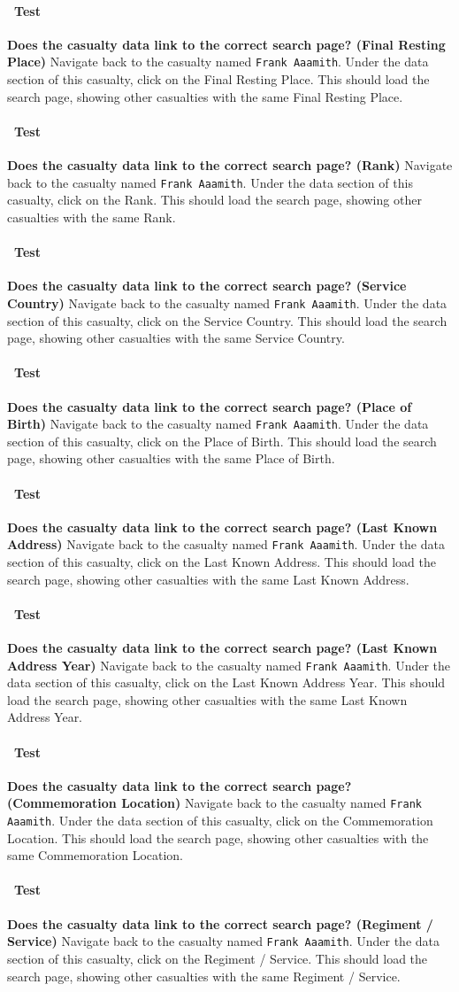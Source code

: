 \documentclass[12pt]{article}
\newcounter{Test}
\newcommand{\test}[1]{%
\stepcounter{Test}%
\paragraph{\Circle\ Test \theTest} \textbf{#1} }
\begin{document}
\test{Does the casualty data link to the correct search page? (Final Resting Place)}
Navigate back to the casualty named \texttt{Frank Aaamith}. Under the data section of this casualty, click on the Final Resting Place. This should load the search page, showing other casualties with the same Final Resting Place.

\test{Does the casualty data link to the correct search page? (Rank)}
Navigate back to the casualty named \texttt{Frank Aaamith}. Under the data section of this casualty, click on the Rank. This should load the search page, showing other casualties with the same Rank.

\test{Does the casualty data link to the correct search page? (Service Country)}
Navigate back to the casualty named \texttt{Frank Aaamith}. Under the data section of this casualty, click on the Service Country. This should load the search page, showing other casualties with the same Service Country.

\test{Does the casualty data link to the correct search page? (Place of Birth)}
Navigate back to the casualty named \texttt{Frank Aaamith}. Under the data section of this casualty, click on the Place of Birth. This should load the search page, showing other casualties with the same Place of Birth.

\test{Does the casualty data link to the correct search page? (Last Known Address)}
Navigate back to the casualty named \texttt{Frank Aaamith}. Under the data section of this casualty, click on the Last Known Address. This should load the search page, showing other casualties with the same Last Known Address.

\test{Does the casualty data link to the correct search page? (Last Known Address Year)}
Navigate back to the casualty named \texttt{Frank Aaamith}. Under the data section of this casualty, click on the Last Known Address Year. This should load the search page, showing other casualties with the same Last Known Address Year.

\test{Does the casualty data link to the correct search page? (Commemoration Location)}
Navigate back to the casualty named \texttt{Frank Aaamith}. Under the data section of this casualty, click on the Commemoration Location. This should load the search page, showing other casualties with the same Commemoration Location.

\test{Does the casualty data link to the correct search page? (Regiment / Service)}
Navigate back to the casualty named \texttt{Frank Aaamith}. Under the data section of this casualty, click on the Regiment / Service. This should load the search page, showing other casualties with the same Regiment / Service.
\end{document}
